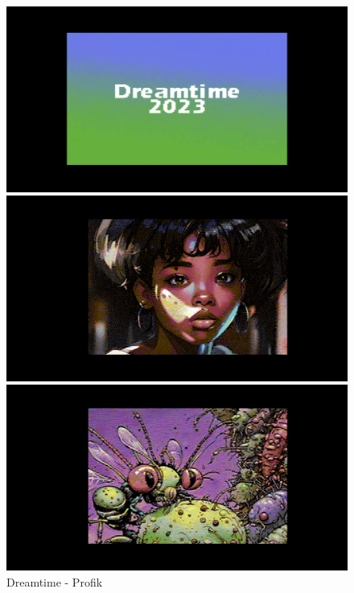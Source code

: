 \begin{figure}[h]
  \begin{minipage}[b]{0.30\linewidth}
    \centering
    \includegraphics[width=\linewidth]{images/demoscene/demos/dreamtime1.png}
  \end{minipage}
  \hfill
  \begin{minipage}[b]{0.30\linewidth}
    \centering
    \includegraphics[width=\linewidth]{images/demoscene/demos/dreamtime2.png}
  \end{minipage}
  \hfill
  \begin{minipage}[b]{0.30\linewidth}
    \centering
    \includegraphics[width=\linewidth]{images/demoscene/demos/dreamtime3.png}
  \end{minipage}
  \caption{Dreamtime - Profik}
  \label{dreamtime}
\end{figure}



